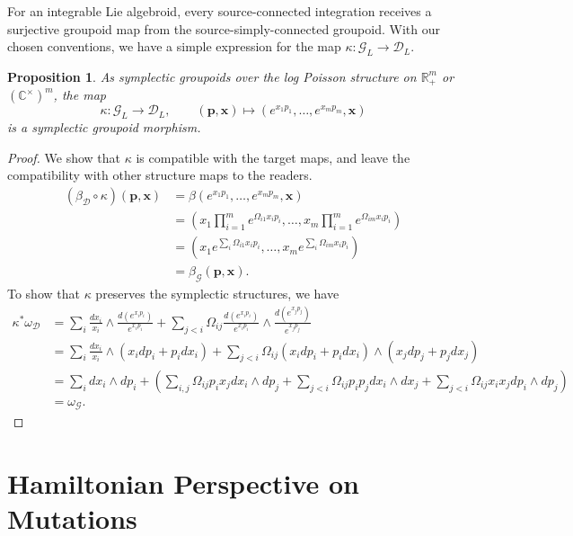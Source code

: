 \documentclass{amsart}
\newtheorem{proposition}[theorem]{Proposition}
\numberwithin{equation}{section}
\newcommand{\bfp}{\mathbf{p}}
\newcommand{\bfx}{\mathbf{x}}
\newcommand{\cG}{\mathcal{G}}
\renewcommand{\cD}{\mathcal{D}}
\newcommand{\CC}{\mathbb{C}}
\newcommand{\RR}{\mathbb{R}}
\begin{document}
For an integrable Lie algebroid, every source-connected integration receives a surjective groupoid map from the source-simply-connected groupoid.
With our chosen conventions, we have a simple expression for the map $\kappa: \cG_L \to \cD_L$.
\begin{proposition}
  As symplectic groupoids over the log Poisson structure on $\RR_+^m$ or $(\CC^\times)^m$, the map
  \[
  	\kappa: \cG_L \to \cD_L, \qquad (\bfp, \bfx) \mapsto (e^{x_1p_1}, \ldots, e^{x_mp_m}, \bfx)
  \]
  is a symplectic groupoid morphism.
\end{proposition}

\begin{proof}
We show that $\kappa$ is compatible with the target maps, and leave the compatibility with other structure maps to the readers.
	\begin{align*}
		(\beta_\cD \circ \kappa) (\bfp, \bfx) & = \beta (e^{x_1p_1}, \ldots, e^{x_mp_m}, \bfx) \\
		& = \left(x_1 \prod_{i=1}^m e^{\Omega_{i1}x_ip_i}, \ldots, x_m \prod_{i=1}^m e^{\Omega_{im}x_ip_i}\right) \\
		& = \left(x_1 e^{\sum_i \Omega_{i1}x_ip_i}, \ldots, x_m  e^{\sum_i \Omega_{im}x_ip_i}\right) \\
		& = \beta_\cG (\bfp, \bfx).
	\end{align*}
To show that $\kappa$ preserves the symplectic structures, we have
	\begin{align*}
		\kappa^*\omega_\cD & = \sum_{i} \frac{dx_i}{x_i} \wedge \frac{d(e^{x_ip_i})}{e^{x_ip_i}} + \sum_{j < i} \Omega_{ij} \frac{d(e^{x_ip_i})}{e^{x_ip_i}} \wedge \frac{d(e^{x_jp_j})}{e^{x_jp_j}} \\
		& = \sum_{i} \frac{dx_i}{x_i} \wedge (x_i dp_i + p_i dx_i) + \sum_{j < i} \Omega_{ij} (x_i dp_i + p_i dx_i) \wedge (x_j dp_j + p_j dx_j) \\
		& = \sum_{i} dx_i \wedge dp_i
	  	+ \left(
	    	\sum_{i, j} \Omega_{ij}p_ix_j dx_i \wedge dp_j 
	    	+ \sum_{j < i} \Omega_{ij}p_ip_j dx_i \wedge dx_j
	    	+ \sum_{j < i} \Omega_{ij}x_ix_j dp_i \wedge dp_j
	  	\right) \\
		& = \omega_\cG.
	\end{align*}
\end{proof}


\section{Hamiltonian Perspective on Mutations}
\label{sec:cluster}
\end{document}

